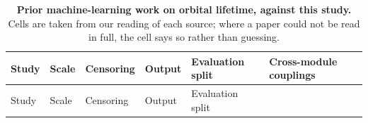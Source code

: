 \documentclass[3p,times]{elsarticle}
\begin{document}
\begin{longtable}[]{@{}
  >{\raggedright\arraybackslash}p{}
  >{\raggedright\arraybackslash}p{}
  >{\raggedright\arraybackslash}p{}
  >{\raggedright\arraybackslash}p{}
  >{\raggedright\arraybackslash}p{}
  >{\raggedright\arraybackslash}p{}@{}}
\caption{\textbf{Prior machine-learning work on orbital lifetime,
against this study.} Cells are taken from our reading of each source;
where a paper could not be read in full, the cell says so rather than
guessing.}\label{tbl:gap}\tabularnewline
\toprule\noalign{}
\begin{minipage}[b]{\linewidth}\raggedright
Study
\end{minipage} & \begin{minipage}[b]{\linewidth}\raggedright
Scale
\end{minipage} & \begin{minipage}[b]{\linewidth}\raggedright
Censoring
\end{minipage} & \begin{minipage}[b]{\linewidth}\raggedright
Output
\end{minipage} & \begin{minipage}[b]{\linewidth}\raggedright
Evaluation split
\end{minipage} & \begin{minipage}[b]{\linewidth}\raggedright
Cross-module couplings
\end{minipage} \\
\midrule\noalign{}
\endfirsthead
\toprule\noalign{}
\begin{minipage}[b]{\linewidth}\raggedright
Study
\end{minipage} & \begin{minipage}[b]{\linewidth}\raggedright
Scale
\end{minipage} & \begin{minipage}[b]{\linewidth}\raggedright
Censoring
\end{minipage} & \begin{minipage}[b]{\linewidth}\raggedright
Output
\end{minipage} & \begin{minipage}[b]{\linewidth}\raggedright
Evaluation split
\end{minipage} & \begin{minipage}[b]{\linewidth}\raggedright

\end{minipage}
\end{longtable}
\end{document}

